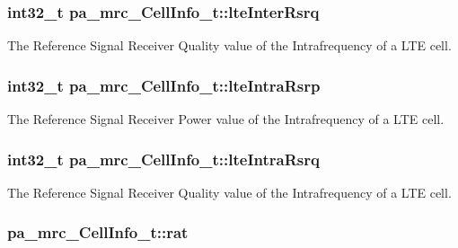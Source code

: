 \subsubsection[{\texorpdfstring{lte\+Inter\+Rsrq}{lteInterRsrq}}]{\setlength{\rightskip}{0pt plus 5cm}int32\+\_\+t pa\+\_\+mrc\+\_\+\+Cell\+Info\+\_\+t\+::lte\+Inter\+Rsrq}\hypertarget{structpa__mrc___cell_info__t_a914938f4108362effb39b3c56e24a339}{}\label{structpa__mrc___cell_info__t_a914938f4108362effb39b3c56e24a339}
The Reference Signal Receiver Quality value of the Intrafrequency of a L\+TE cell. 
\subsubsection[{\texorpdfstring{lte\+Intra\+Rsrp}{lteIntraRsrp}}]{\setlength{\rightskip}{0pt plus 5cm}int32\+\_\+t pa\+\_\+mrc\+\_\+\+Cell\+Info\+\_\+t\+::lte\+Intra\+Rsrp}\hypertarget{structpa__mrc___cell_info__t_a1ff358d29c84bc1a5cd9e93a2a401953}{}\label{structpa__mrc___cell_info__t_a1ff358d29c84bc1a5cd9e93a2a401953}
The Reference Signal Receiver Power value of the Intrafrequency of a L\+TE cell. 
\subsubsection[{\texorpdfstring{lte\+Intra\+Rsrq}{lteIntraRsrq}}]{\setlength{\rightskip}{0pt plus 5cm}int32\+\_\+t pa\+\_\+mrc\+\_\+\+Cell\+Info\+\_\+t\+::lte\+Intra\+Rsrq}\hypertarget{structpa__mrc___cell_info__t_aaec06f09b0a131ce899b7c6e61c4ea9a}{}\label{structpa__mrc___cell_info__t_aaec06f09b0a131ce899b7c6e61c4ea9a}
The Reference Signal Receiver Quality value of the Intrafrequency of a L\+TE cell. 
\subsubsection[{\texorpdfstring{rat}{rat}}]{ pa\+\_\+mrc\+\_\+\+Cell\+Info\+\_\+t\+::rat}\hypertarget{structpa__mrc___cell_info__t_ad3f31121640ff91d1fed94c9ef140549}{}\label{structpa__mrc___cell_info__t_ad3f31121640ff91d1fed94c9ef140549}


